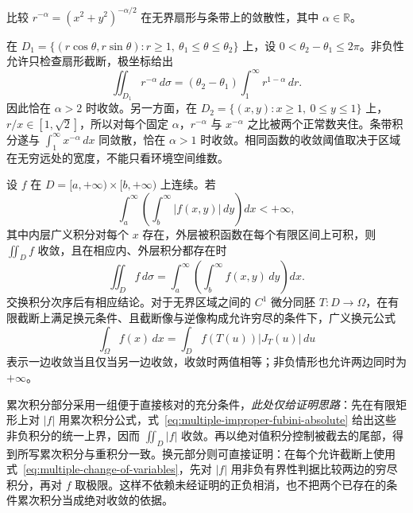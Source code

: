 \documentclass[UTF8,12pt,a4paper,fontset=fandol]{ctexbook}
\begin{document}
\begin{example}
\label{ex:multiple-infinity-sector-strip}
比较 $r^{-\alpha}=(x^2+y^2)^{-\alpha/2}$ 在无界扇形与条带上的敛散性，其中 $\alpha\in\mathbb R$。
\end{example}
\begin{solve}
在 $D_1=\{(r\cos\theta,r\sin\theta):r\geq1,\ \theta_1\leq\theta\leq\theta_2\}$ 上，设 $0<\theta_2-\theta_1\leq2\pi$。非负性允许只检查扇形截断，极坐标给出
\[
    \iint_{D_1}r^{-\alpha}\,d\sigma
    =(\theta_2-\theta_1)\int_1^\infty r^{1-\alpha}\,dr.
\]
因此恰在 $\alpha>2$ 时收敛。另一方面，在 $D_2=\{(x,y):x\geq1,\ 0\leq y\leq1\}$ 上，$r/x\in[1,\sqrt2]$，所以对每个固定 $\alpha$，$r^{-\alpha}$ 与 $x^{-\alpha}$ 之比被两个正常数夹住。条带积分遂与 $\int_1^\infty x^{-\alpha}\,dx$ 同敛散，恰在 $\alpha>1$ 时收敛。相同函数的收敛阈值取决于区域在无穷远处的宽度，不能只看环境空间维数。
\end{solve}

\begin{theorem}[广义重积分的累次积分与换元]
\label{thm:multiple-improper-fubini-change}
设 $f$ 在 $D=[a,+\infty)\times[b,+\infty)$ 上连续。若
\begin{equation}
    \int_a^\infty\left(\int_b^\infty|f(x,y)|\,dy\right)dx<+\infty,
    \label{eq:multiple-improper-fubini-absolute}
\end{equation}
其中内层广义积分对每个 $x$ 存在，外层被积函数在每个有限区间上可积，则 $\iint_Df$ 收敛，且在相应内、外层积分都存在时
\[
    \iint_Df\,d\sigma
    =\int_a^\infty\left(\int_b^\infty f(x,y)\,dy\right)dx.
\]
交换积分次序后有相应结论。对于无界区域之间的 $C^1$ 微分同胚 $T:D\to\Omega$，在有限截断上满足换元条件、且截断像与逆像构成允许穷尽的条件下，广义换元公式
\begin{equation}
    \int_\Omega f(x)\,dx=\int_Df(T(u))|J_T(u)|\,du
    \label{eq:multiple-improper-change-of-variables}
\end{equation}
表示一边收敛当且仅当另一边收敛，收敛时两值相等；非负情形也允许两边同时为 $+\infty$。
\end{theorem}

累次积分部分采用一组便于直接核对的充分条件，\emph{此处仅给证明思路}：先在有限矩形上对 $|f|$ 用累次积分公式，式~\eqref{eq:multiple-improper-fubini-absolute} 给出这些非负积分的统一上界，因而 $\iint_D|f|$ 收敛。再以绝对值积分控制被截去的尾部，得到所写累次积分与重积分一致。换元部分则可直接证明：在每个允许截断上使用式~\eqref{eq:multiple-change-of-variables}，先对 $|f|$ 用非负有界性判据比较两边的穷尽积分，再对 $f$ 取极限。这样不依赖未经证明的正负相消，也不把两个已存在的条件累次积分当成绝对收敛的依据。
\end{document}
